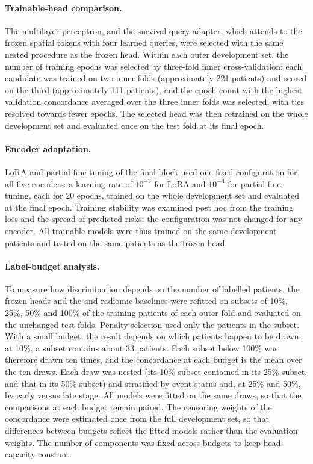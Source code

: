 \paragraph{Trainable-head comparison.} The multilayer perceptron, and the survival query adapter, which attends to the frozen spatial tokens with four learned queries, were selected with the same nested procedure as the frozen head. Within each outer development set, the number of training epochs was selected by three-fold inner cross-validation: each candidate was trained on two inner folds (approximately 221 patients) and scored on the third (approximately 111 patients), and the epoch count with the highest validation concordance averaged over the three inner folds was selected, with ties resolved towards fewer epochs. The selected head was then retrained on the whole development set and evaluated once on the test fold at its final epoch.

\paragraph{Encoder adaptation.} LoRA\cite{hu2021} and partial fine-tuning of the final block used one fixed configuration for all five encoders: a learning rate of $10^{-3}$ for LoRA and $10^{-4}$ for partial fine-tuning, each for 20 epochs, trained on the whole development set and evaluated at the final epoch. Training stability was examined post hoc from the training loss and the spread of predicted risks; the configuration was not changed for any encoder. All trainable models were thus trained on the same development patients and tested on the same patients as the frozen head.

\paragraph{Label-budget analysis.} To measure how discrimination depends on the number of labelled patients, the frozen heads and the  and radiomic baselines were refitted on subsets of 10\%, 25\%, 50\% and 100\% of the training patients of each outer fold and evaluated on the unchanged test folds. Penalty selection used only the patients in the subset. With a small budget, the result depends on which patients happen to be drawn: at 10\%, a subset contains about 33 patients. Each subset below 100\% was therefore drawn ten times, and the concordance at each budget is the mean over the ten draws. Each draw was nested (its 10\% subset contained in its 25\% subset, and that in its 50\% subset) and stratified by event status and, at 25\% and 50\%, by early versus late stage. All models were fitted on the same draws, so that the comparisons at each budget remain paired. The censoring weights of the concordance were estimated once from the full development set, so that differences between budgets reflect the fitted models rather than the evaluation weights. The number of components was fixed across budgets to keep head capacity constant. 

